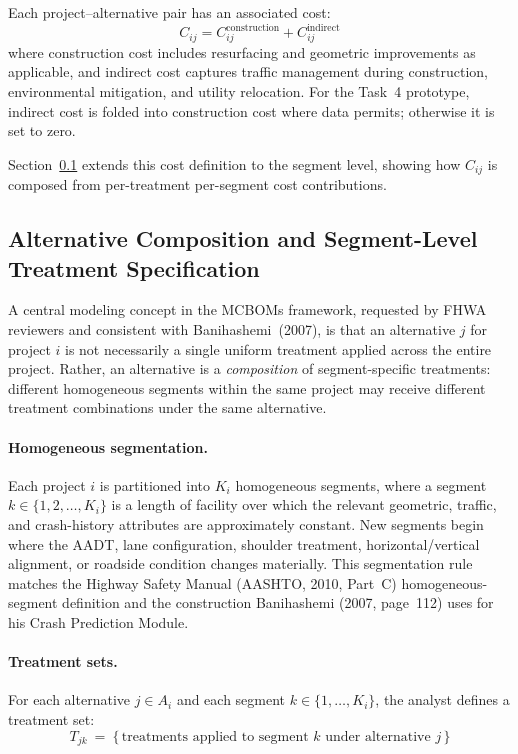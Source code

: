 Each project--alternative pair has an associated cost:
\begin{equation}
C_{ij} = C_{ij}^{\mathrm{construction}} + C_{ij}^{\mathrm{indirect}}
\end{equation}
\noindent where construction cost includes resurfacing and geometric
improvements as applicable, and indirect cost captures traffic management
during construction, environmental mitigation, and utility relocation. For the
Task~4 prototype, indirect cost is folded into construction cost where data
permits; otherwise it is set to zero.

Section~\ref{sec:alt-composition} extends this cost definition to the
segment level, showing how $C_{ij}$ is composed from per-treatment
per-segment cost contributions.

\subsection{Alternative Composition and Segment-Level Treatment Specification}
\label{sec:alt-composition}

A central modeling concept in the MCBOMs framework, requested by FHWA
reviewers and consistent with Banihashemi~(2007), is that an alternative
$j$ for project $i$ is not necessarily a single uniform treatment applied
across the entire project. Rather, an alternative is a \emph{composition}
of segment-specific treatments: different homogeneous segments within the
same project may receive different treatment combinations under the same
alternative.

\paragraph{Homogeneous segmentation.} Each project $i$ is partitioned into
$K_i$ homogeneous segments, where a segment $k \in \{1, 2, \ldots, K_i\}$
is a length of facility over which the relevant geometric, traffic, and
crash-history attributes are approximately constant. New segments begin
where the AADT, lane configuration, shoulder treatment, horizontal/vertical
alignment, or roadside condition changes materially. This segmentation rule
matches the Highway Safety Manual (AASHTO, 2010, Part~C) homogeneous-segment
definition and the construction Banihashemi (2007, page~112) uses for his
Crash Prediction Module.

\paragraph{Treatment sets.} For each alternative $j \in A_i$ and each
segment $k \in \{1, \ldots, K_i\}$, the analyst defines a treatment set:
\begin{equation*}
T_{jk}\ =\ \{\,\text{treatments applied to segment } k \text{ under alternative } j\,\}
\end{equation*}

